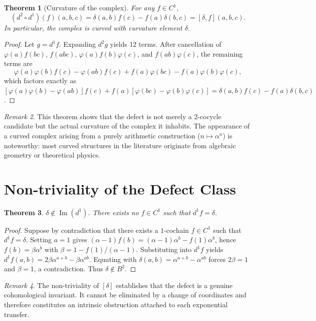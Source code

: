 \documentclass[11pt,a4paper]{article}
\theoremstyle{plain}
\newtheorem{theorem}{Theorem}[section]
\theoremstyle{definition}
\theoremstyle{remark}
\newtheorem{remark}[theorem]{Remark}
\begin{document}
	\begin{theorem}[Curvature of the complex]
		\label{thm:non-standard}
		For any $f\in C^1$,
		\[
		(d^2\circ d^1)(f)(a,b,c)=\delta(a,b)f(c)-f(a)\delta(b,c)=[\delta,f](a,b,c).
		\]
		In particular, the complex is curved with curvature element $\delta$.
	\end{theorem}
	
	\begin{proof}
		Let $g=d^1 f$. Expanding $d^2 g$ yields 12 terms. After cancellation of $\varphi(a)f(bc)$, $f(abc)$, $\varphi(a)f(b)\varphi(c)$, and $f(ab)\varphi(c)$, the remaining terms are
		\[
		\varphi(a)\varphi(b)f(c)-\varphi(ab)f(c)+f(a)\varphi(bc)-f(a)\varphi(b)\varphi(c),
		\]
		which factors exactly as $[\varphi(a)\varphi(b)-\varphi(ab)]f(c)+f(a)[\varphi(bc)-\varphi(b)\varphi(c)]=\delta(a,b)f(c)-f(a)\delta(b,c)$.
	\end{proof}
	
	\begin{remark}
		This theorem shows that the defect is not merely a 2-cocycle candidate but the actual curvature of the complex it inhabits. The appearance of a curved complex arising from a purely arithmetic construction ($n\mapsto\alpha^n$) is noteworthy: most curved structures in the literature originate from algebraic geometry or theoretical physics.
	\end{remark}
	
	\section{Non-triviality of the Defect Class}
	\label{sec:nontrivial}
	\begin{theorem}
		\label{thm:nontrivial}
		$\delta \notin \operatorname{Im}(d^1)$. There exists no $f\in C^1$ such that $d^1f=\delta$.
	\end{theorem}
	
	\begin{proof}
		Suppose by contradiction that there exists a $1$-cochain $f \in C^1$ such that $d^1 f = \delta$. Setting $a=1$ gives $(\alpha-1)f(b)=(\alpha-1)\alpha^b-f(1)\alpha^b$, hence $f(b)=\beta\alpha^b$ with $\beta=1-f(1)/(\alpha-1)$. Substituting into $d^1f$ yields $d^1f(a,b)=2\beta\alpha^{a+b}-\beta\alpha^{ab}$. Equating with $\delta(a,b)=\alpha^{a+b}-\alpha^{ab}$ forces $2\beta=1$ and $\beta=1$, a contradiction. Thus $\delta\notin B^2$.
	\end{proof}
	
	\begin{remark}
		The non-triviality of $[\delta]$ establishes that the defect is a genuine cohomological invariant. It cannot be eliminated by a change of coordinates and therefore constitutes an intrinsic obstruction attached to each exponential transfer.
	\end{remark}
	
\end{document}
